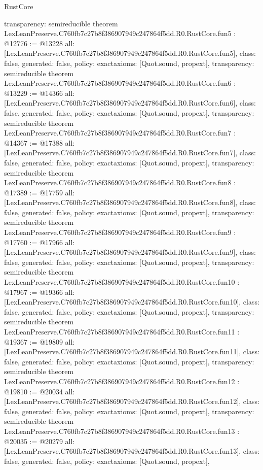 \begin{lexlean}{RustCore}
\begin{coremodule}
{  transparency: semireducible
}
theorem LexLeanPreserve.C760fb7c27b8f386907949c247864f5dd.R0.RustCore.fun5 : @12776 := @13228 {
  all: [LexLeanPreserve.C760fb7c27b8f386907949c247864f5dd.R0.RustCore.fun5],
  class: false,
  generated: false,
  policy: exact{axioms: [Quot.sound, propext]},
  transparency: semireducible
}
theorem LexLeanPreserve.C760fb7c27b8f386907949c247864f5dd.R0.RustCore.fun6 : @13229 := @14366 {
  all: [LexLeanPreserve.C760fb7c27b8f386907949c247864f5dd.R0.RustCore.fun6],
  class: false,
  generated: false,
  policy: exact{axioms: [Quot.sound, propext]},
  transparency: semireducible
}
theorem LexLeanPreserve.C760fb7c27b8f386907949c247864f5dd.R0.RustCore.fun7 : @14367 := @17388 {
  all: [LexLeanPreserve.C760fb7c27b8f386907949c247864f5dd.R0.RustCore.fun7],
  class: false,
  generated: false,
  policy: exact{axioms: [Quot.sound, propext]},
  transparency: semireducible
}
theorem LexLeanPreserve.C760fb7c27b8f386907949c247864f5dd.R0.RustCore.fun8 : @17389 := @17759 {
  all: [LexLeanPreserve.C760fb7c27b8f386907949c247864f5dd.R0.RustCore.fun8],
  class: false,
  generated: false,
  policy: exact{axioms: [Quot.sound, propext]},
  transparency: semireducible
}
theorem LexLeanPreserve.C760fb7c27b8f386907949c247864f5dd.R0.RustCore.fun9 : @17760 := @17966 {
  all: [LexLeanPreserve.C760fb7c27b8f386907949c247864f5dd.R0.RustCore.fun9],
  class: false,
  generated: false,
  policy: exact{axioms: [Quot.sound, propext]},
  transparency: semireducible
}
theorem LexLeanPreserve.C760fb7c27b8f386907949c247864f5dd.R0.RustCore.fun10 : @17967 := @19366 {
  all: [LexLeanPreserve.C760fb7c27b8f386907949c247864f5dd.R0.RustCore.fun10],
  class: false,
  generated: false,
  policy: exact{axioms: [Quot.sound, propext]},
  transparency: semireducible
}
theorem LexLeanPreserve.C760fb7c27b8f386907949c247864f5dd.R0.RustCore.fun11 : @19367 := @19809 {
  all: [LexLeanPreserve.C760fb7c27b8f386907949c247864f5dd.R0.RustCore.fun11],
  class: false,
  generated: false,
  policy: exact{axioms: [Quot.sound, propext]},
  transparency: semireducible
}
theorem LexLeanPreserve.C760fb7c27b8f386907949c247864f5dd.R0.RustCore.fun12 : @19810 := @20034 {
  all: [LexLeanPreserve.C760fb7c27b8f386907949c247864f5dd.R0.RustCore.fun12],
  class: false,
  generated: false,
  policy: exact{axioms: [Quot.sound, propext]},
  transparency: semireducible
}
theorem LexLeanPreserve.C760fb7c27b8f386907949c247864f5dd.R0.RustCore.fun13 : @20035 := @20279 {
  all: [LexLeanPreserve.C760fb7c27b8f386907949c247864f5dd.R0.RustCore.fun13],
  class: false,
  generated: false,
  policy: exact{axioms: [Quot.sound, propext]},
}
\end{coremodule}
\end{lexlean}
